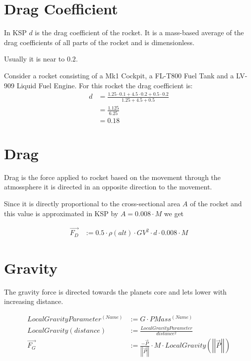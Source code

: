 \documentclass[11pt]{article}
\newcommand{\oa}[1]{\overrightarrow{#1}}
\newcommand{\F}[1]{\oa{F_{#1}}}
\newcommand{\Pos}{\oa{P}}
\newcommand{\absvec}[1]{\left|\left|{#1}\right|\right|}
\begin{document}
\section{Drag Coefficient}

In KSP $d$ is the drag coefficient of the rocket. It is a mass-based
average of the drag coefficients of all parts of the rocket and is
dimensionless.

Usually it is near to $0.2$.

Consider a rocket consisting of a Mk1 Cockpit, a FL-T800 Fuel Tank and
a LV-909 Liquid Fuel Engine. For this rocket the drag coefficient is:
\begin{align}
  d &= \frac{1.25 \cdot 0.1 + 4.5 \cdot 0.2 + 0.5 \cdot 0.2}{ 1.25 + 4.5 + 0.5 }\nonumber\\
  &= \frac{1.125}{6.25}\nonumber\\
  &= 0.18\nonumber
\end{align}

\section{Drag}

Drag is the force applied to rocket based on the movement through the
atmossphere it is directed in an opposite direction to the movement.

Since it is directly proportional to the cross-sectional area $A$ of
the rocket and this value is approximated in KSP by $A = 0.008 \cdot
M$ we get

\begin{align}
  \F{D} &:= 0.5 \cdot \rho(alt)\cdot GV^2\cdot d \cdot 0.008 \cdot M
\end{align}


\section{Gravity}

The gravity force is directed towards the planets core and lets lower
with increasing distance.

\begin{align}
  LocalGravityParameter^{(Name)} &:= G \cdot PMass^{(Name)} \nonumber\\
  LocalGravity(distance) &:= \frac{LocalGravityParameter}{distance^2}\nonumber\\ 
  \F{G} &:= \frac{- \Pos}{\absvec{\Pos}}\cdot M \cdot LocalGravity\left(\absvec{\Pos}\right)
\end{align}
\end{document}
